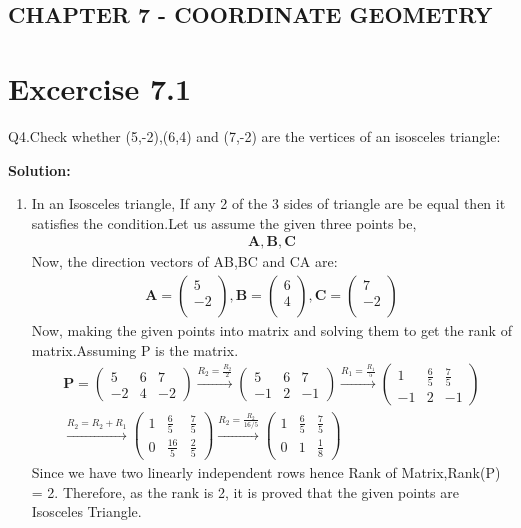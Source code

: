 \documentclass[12pt]{article}
\newcommand{\solution}{\noindent \textbf{Solution: }}
\newcommand{\myvec}[1]{\ensuremath{\begin{pmatrix}#1\end{pmatrix}}}
\let\vec\mathbf
\begin{document}
\begin{center}
\section*{CHAPTER 7 - COORDINATE GEOMETRY}

\end{center}
\section*{Excercise 7.1}

Q4.Check whether (5,-2),(6,4) and (7,-2) are the vertices of an isosceles triangle:

\solution
\begin{enumerate}
\item In an Isosceles triangle, If any 2 of the 3 sides of  triangle are be equal then it satisfies the condition.Let us assume the given three points be,
	\begin{align}
\vec{A} , \vec{B} , \vec{C}
	\end{align}
Now, the direction vectors of AB,BC and CA are:
	\begin{align}
	\vec{A} = \myvec{
	    5\\
	   -2\\
		},
	\vec{B} = \myvec{
	    6\\
		4\\
		},
	\vec{C} = \myvec{
		7\\
	   -2\\
	    }
	\end{align}  
Now, making the given points into matrix and solving them to get the rank of matrix.Assuming P is the matrix.
	\begin{align}
\vec{P} = \myvec{
5&6&7\\
-2&4&-2
}\xrightarrow[]{R_2=\frac{R_2}{2}}
\myvec{
5&6&7\\
-1&2&-1
}\xrightarrow[]{R_1=\frac{R_1}{5}}
\myvec{
1&\frac{6}{5}&\frac{7}{5}\\
-1&2&-1
}\\\xrightarrow[]{R_2=R_2+R_1}
\myvec{
1&\frac{6}{5}&\frac{7}{5}\\
0&\frac{16}{5}&\frac{2}{5}
}\xrightarrow[]{R_2=\frac{R_2}{16/5}}
\myvec{
1&\frac{6}{5}&\frac{7}{5}\\
0&1&\frac{1}{8}
}
	\end{align}
Since we have two linearly independent rows hence Rank of Matrix,Rank(P) = 2.
Therefore, as the rank is 2, it is proved that the given points are Isosceles Triangle.

\end{enumerate}
\end{document}
